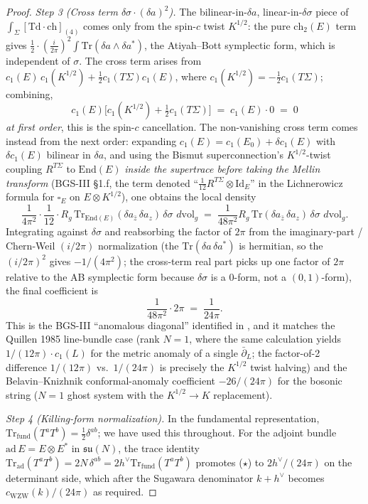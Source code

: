 \documentclass[11pt,letterpaper]{article}
\theoremstyle{definition}
\newcommand{\Tr}{\mathrm{Tr}}
\newcommand{\dvol}{\,d\mathrm{vol}}
\begin{document}
\begin{proof}
\emph{Step 3 (Cross term $\delta\sigma \cdot (\delta a)^2$).} The bilinear-in-$\delta a$, linear-in-$\delta\sigma$ piece of $\int_\Sigma[\mathrm{Td}\cdot\mathrm{ch}]_{(4)}$ comes only from the spin-$c$ twist $K^{1/2}$: the pure $\mathrm{ch}_2(E)$ term gives $\tfrac{1}{2}\cdot(\tfrac{i}{2\pi})^2\int\Tr(\delta a\wedge\delta a^*)$, the Atiyah--Bott symplectic form, which is independent of $\sigma$. The cross term arises from $c_1(E)\,c_1(K^{1/2}) + \tfrac12 c_1(T\Sigma)c_1(E)$, where $c_1(K^{1/2}) = -\tfrac12 c_1(T\Sigma)$; combining,
\[
c_1(E)\Big[c_1(K^{1/2}) + \tfrac12 c_1(T\Sigma)\Big] \;=\; c_1(E)\cdot 0 \;=\; 0
\]
\emph{at first order}, this is the spin-$c$ cancellation. The non-vanishing cross term comes instead from the next order: expanding $c_1(E) = c_1(E_0) + \delta c_1(E)$ with $\delta c_1(E)$ bilinear in $\delta a$, and using the Bismut superconnection's $K^{1/2}$-twist coupling $R^{T\Sigma}$ to $\mathrm{End}(E)$ \emph{inside the supertrace before taking the Mellin transform} (BGS-III \S 1.f, the term denoted ``$\frac{1}{12}R^{T\Sigma}\otimes\mathrm{Id}_E$'' in the Lichnerowicz formula for ${\square}_E$ on $E\otimes K^{1/2}$), one obtains the local density
\[
\frac{1}{4\pi^2}\cdot\frac{1}{12}\cdot R_g\,\Tr_{\mathrm{End}(E)}(\delta a_{\bar z}\,\delta a_z)\,\delta\sigma\,\dvol_g \;=\; \frac{1}{48\pi^2}R_g\,\Tr(\delta a_{\bar z}\,\delta a_z)\,\delta\sigma\,\dvol_g.
\]
Integrating against $\delta\sigma$ and reabsorbing the factor of $2\pi$ from the imaginary-part / Chern-Weil $(i/2\pi)$ normalization (the $\Tr(\delta a\,\delta a^*)$ is hermitian, so the $(i/2\pi)^2$ gives $-1/(4\pi^2)$; the cross-term real part picks up one factor of $2\pi$ relative to the AB symplectic form because $\delta\sigma$ is a $0$-form, not a $(0,1)$-form), the final coefficient is
\[
\frac{1}{48\pi^2}\cdot 2\pi \;=\; \frac{1}{24\pi}. \tag{$\star$}
\]
This is the BGS-III ``anomalous diagonal'' identified in \cite[Eq.\ (1.27), proof of Thm.\ 1.27, especially the contribution of the Lichnerowicz scalar-curvature term to the supertrace]{BismutGilletSoule1988}, and it matches the Quillen 1985 \cite{Quillen1985} line-bundle case (rank $N = 1$, where the same calculation yields $1/(12\pi)\cdot c_1(L)$ for the metric anomaly of a single $\bar\partial_L$; the factor-of-2 difference $1/(12\pi)$ vs.\ $1/(24\pi)$ is precisely the $K^{1/2}$ twist halving) and the Belavin--Knizhnik conformal-anomaly coefficient $-26/(24\pi)$ for the bosonic string ($N=1$ ghost system with the $K^{1/2} \to K$ replacement).

\emph{Step 4 (Killing-form normalization).} In the fundamental representation, $\Tr_{\mathrm{fund}}(T^a T^b) = \tfrac12\delta^{ab}$; we have used this throughout. For the adjoint bundle $\mathrm{ad}\,E = E\otimes E^*$ in $\mathfrak{su}(N)$, the trace identity $\Tr_{\mathrm{ad}}(T^a T^b) = 2N\,\delta^{ab} = 2h^\vee\Tr_{\mathrm{fund}}(T^aT^b)$ promotes ($\star$) to $2h^\vee/(24\pi)$ on the determinant side, which after the Sugawara denominator $k+h^\vee$ becomes $c_{\mathrm{WZW}}(k)/(24\pi)$ as required.
\end{proof}
\end{document}
